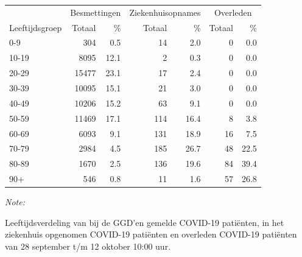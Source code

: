 \documentclass[
  english,
  man,floatsintext]{apa6}
\begin{document}
\begin{table}[H]
\centering\begingroup\fontsize{11}{13}\selectfont

\begin{threeparttable}
\begin{tabular}{lrrrrrr}
\toprule
\multicolumn{1}{c}{ } & \multicolumn{2}{c}{Besmettingen} & \multicolumn{2}{c}{Ziekenhuisopnames} & \multicolumn{2}{c}{Overleden} \\
\cmidrule(l{3pt}r{3pt}){2-3} \cmidrule(l{3pt}r{3pt}){4-5} \cmidrule(l{3pt}r{3pt}){6-7}
Leeftijdsgroep & Totaal & \% & Totaal & \% & Totaal & \%\\
\midrule
0-9 & 304 & 0.5 & 14 & 2.0 & 0 & 0.0\\
10-19 & 8095 & 12.1 & 2 & 0.3 & 0 & 0.0\\
20-29 & 15477 & 23.1 & 17 & 2.4 & 0 & 0.0\\
30-39 & 10095 & 15.1 & 21 & 3.0 & 0 & 0.0\\
40-49 & 10206 & 15.2 & 63 & 9.1 & 0 & 0.0\\
50-59 & 11469 & 17.1 & 114 & 16.4 & 8 & 3.8\\
60-69 & 6093 & 9.1 & 131 & 18.9 & 16 & 7.5\\
70-79 & 2984 & 4.5 & 185 & 26.7 & 48 & 22.5\\
80-89 & 1670 & 2.5 & 136 & 19.6 & 84 & 39.4\\
90+ & 546 & 0.8 & 11 & 1.6 & 57 & 26.8\\
\bottomrule
\end{tabular}
\begin{tablenotes}
\item \textit{Note: } 
\item Leeftijdsverdeling van bij de GGD’en gemelde COVID-19 patiënten, in het ziekenhuis opgenomen COVID-19 patiënten en overleden COVID-19 patiënten van 28 september t/m 12 oktober 10:00 uur.
\end{tablenotes}
\end{threeparttable}
\endgroup{}
\end{table}
\end{document}
